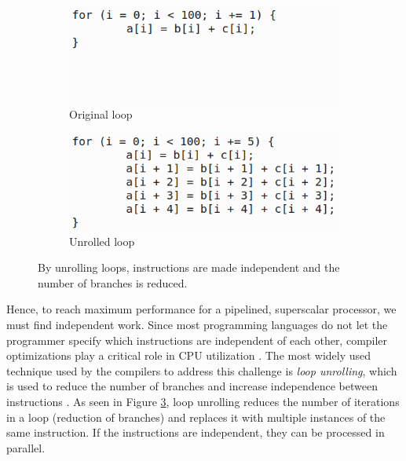 \begin{figure}
  \centering
  \begin{subfigure}{0.48\textwidth}
    \includegraphics[width=\textwidth]{img/loop-unrolling-1.png}
    \caption{Original loop}
    \label{fig:loop-unrolling-1} 
  \end{subfigure}
  \begin{subfigure}{0.48\textwidth}
    \includegraphics[width=\textwidth]{img/loop-unrolling-2.png}
    \caption{Unrolled loop}
    \label{fig:loop-unrolling-2} 
  \end{subfigure}
  \caption{By unrolling loops, instructions are made independent and the number of branches is reduced.}
  \label{fig:loop-unrolling} 
\end{figure}
Hence, to reach maximum performance for a pipelined, superscalar processor, we must find independent work. Since most programming languages do not let the programmer specify which instructions are independent of each other, compiler optimizations play a critical role in CPU utilization \cite{Boncz2005-wj}. The most widely used technique used by the compilers to address this challenge is \textit{loop unrolling}, which is used to reduce the number of branches and increase independence between instructions \cite{Wikipedia_contributors2015-zc}. As seen in Figure \ref{fig:loop-unrolling}, loop unrolling reduces the number of iterations in a loop (reduction of branches) and replaces it with multiple instances of the same instruction. If the instructions are independent, they can be processed in parallel.

